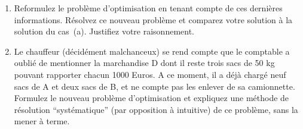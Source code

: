 \begin{enumerate}
\begin{enumerate}
      \item Reformulez le problème d'optimisation en tenant compte de ces
        dernières informations. Résolvez ce nouveau problème et comparez
        votre solution à la solution du cas~(a). Justifiez votre
        raisonnement.

      \item Le chauffeur (décidément malchanceux) se rend compte que le
        comptable a oublié de mentionner la marchandise D dont il reste
        trois sacs de 50 kg pouvant rapporter chacun 1000 Euros. A ce
        moment, il a déjà chargé neuf sacs de A et deux sacs de B, et ne
        compte pas les enlever de sa camionnette. Formulez le nouveau
        problème d'optimisation et expliquez une méthode de résolution
        ``systématique'' (par opposition à intuitive) de ce problème,
        sans la mener à terme.

    \end{enumerate}


\end{enumerate}
